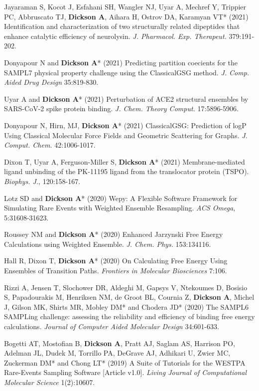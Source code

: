 \documentclass[margin,line]{res}
\begin{document}
\begin{resume}
\begin{spacing}{1.2}
\begin{thebibliography}{10}
  Jayaraman S, Kocot J, Esfahani SH, Wangler NJ, Uyar A, Mechref Y, Trippier PC, Abbruscato TJ, {\bf Dickson A}, Aihara H, Ostrov DA, Karamyan VT* (2021) Identification and characterization of two structurally related dipeptides that enhance catalytic efficiency of neurolysin.
  \newblock \textit{J. Pharmacol. Exp. Therapeut.} 379:191-202.
  
Donyapour N and {\bf Dickson A}* (2021) Predicting partition coecients for the SAMPL7 physical property challenge using the ClassicalGSG method.
\newblock \textit{J. Comp. Aided Drug Design} 35:819-830.

Uyar A and {\bf Dickson A}* (2021) Perturbation of ACE2 structural ensembles by SARS-CoV-2 spike protein binding.
\newblock \textit{J. Chem. Theory Comput.} 17:5896-5906.

Donyapour N, Hirn, MJ, {\bf Dickson A}* (2021) ClassicalGSG: Prediction of logP Using Classical Molecular Force Fields and Geometric Scattering for Graphs.
\newblock \textit{J. Comput. Chem.} 42:1006-1017.

Dixon T, Uyar A, Ferguson-Miller S, {\bf Dickson A}* (2021) Membrane-mediated ligand unbinding of the PK-11195 ligand from the translocator protein (TSPO).
\newblock \textit{Biophys. J.}, 120:158-167.

Lotz SD and {\bf Dickson A}* (2020) Wepy: A Flexible Software Framework for Simulating Rare Events with Weighted Ensemble Resampling.
\newblock \textit{ACS Omega}, 5:31608-31623.

Roussey NM and {\bf Dickson A}* (2020) Enhanced Jarzynski Free Energy Calculations using Weighted Ensemble.
\newblock \textit{J. Chem. Phys.} 153:134116.

Hall R, Dixon T, {\bf Dickson A}* (2020) On Calculating Free Energy Using Ensembles of Transition Paths. 
\newblock \textit{Frontiers in Molecular Biosciences} 7:106.

Rizzi A, Jensen T, Slochower DR, Aldeghi M, Gapsys V, Ntekoumes D, Bosisio S, Papadourakis M, Henriksen NM, de Groot BL, Cournia Z, {\bf Dickson A}, Michel J, Gilson MK, Shirts MR, Mobley DM* and Chodera JD* (2020) The SAMPL6 SAMPLing challenge: assessing the reliability and efficiency of binding free energy calculations. 
\newblock \textit{Journal of Computer Aided Molecular Design} 34:601-633.

  Bogetti AT, Mostofian B, {\bf Dickson A}, Pratt AJ, Saglam AS, Harrison PO, Adelman JL, Dudek M, Torrillo PA, DeGrave AJ, Adhikari U, Zwier MC, Zuckerman DM* and Chong LT* (2019) A Suite of Tutorials for the WESTPA Rare-Events Sampling Software [Article v1.0].
\newblock \textit{Living Journal of Computational Molecular Science} 1(2):10607.


\end{thebibliography}
\end{spacing}
\end{resume}
\end{document}
